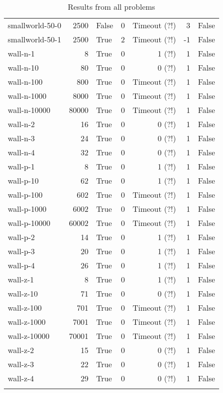 \begin{longtable}{lrlrrrl}
smallworld-50-0 & 2500 & False & 0 & Timeout (?!) & 3 & False \\
smallworld-50-1 & 2500 & True & 2 & Timeout (?!) & -1 & False \\
wall-n-1 & 8 & True & 0 & 1 (?!) & 1 & False \\
wall-n-10 & 80 & True & 0 & 0 (?!) & 1 & False \\
wall-n-100 & 800 & True & 0 & Timeout (?!) & 1 & False \\
wall-n-1000 & 8000 & True & 0 & Timeout (?!) & 1 & False \\
wall-n-10000 & 80000 & True & 0 & Timeout (?!) & 1 & False \\
wall-n-2 & 16 & True & 0 & 0 (?!) & 1 & False \\
wall-n-3 & 24 & True & 0 & 0 (?!) & 1 & False \\
wall-n-4 & 32 & True & 0 & 0 (?!) & 1 & False \\
wall-p-1 & 8 & True & 0 & 1 (?!) & 1 & False \\
wall-p-10 & 62 & True & 0 & 1 (?!) & 1 & False \\
wall-p-100 & 602 & True & 0 & Timeout (?!) & 1 & False \\
wall-p-1000 & 6002 & True & 0 & Timeout (?!) & 1 & False \\
wall-p-10000 & 60002 & True & 0 & Timeout (?!) & 1 & False \\
wall-p-2 & 14 & True & 0 & 1 (?!) & 1 & False \\
wall-p-3 & 20 & True & 0 & 1 (?!) & 1 & False \\
wall-p-4 & 26 & True & 0 & 1 (?!) & 1 & False \\
wall-z-1 & 8 & True & 0 & 1 (?!) & 1 & False \\
wall-z-10 & 71 & True & 0 & 0 (?!) & 1 & False \\
wall-z-100 & 701 & True & 0 & Timeout (?!) & 1 & False \\
wall-z-1000 & 7001 & True & 0 & Timeout (?!) & 1 & False \\
wall-z-10000 & 70001 & True & 0 & Timeout (?!) & 1 & False \\
wall-z-2 & 15 & True & 0 & 0 (?!) & 1 & False \\
wall-z-3 & 22 & True & 0 & 0 (?!) & 1 & False \\
wall-z-4 & 29 & True & 0 & 0 (?!) & 1 & False \\
\caption{Results from all problems}\label{table:results}
\end{longtable}
